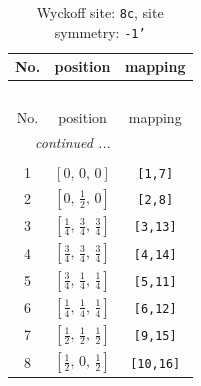 \documentclass[fleqn,8pt]{jsarticle}
\begin{document}
\renewcommand{\arraystretch}{1.2}
\begin{longtable}{ccc}
\caption{Wyckoff site: {\tt 8c}, site symmetry: {\tt -1'}}
 \\
 \hline \hline
No. & position & mapping \\ \hline \endfirsthead

\multicolumn{2}{l}{\tablename\ \thetable{}} \\
 \hline \hline
No. & position & mapping \\ \hline \endhead

 \hline \hline
\multicolumn{2}{r}{\footnotesize\it continued ...} \\ \endfoot

 \hline \hline
\multicolumn{2}{r}{} \\ \endlastfoot

1 & $\left[ 0,\, 0,\, 0 \right]$ & {\tt [1,7]} \\ \hline
2 & $\left[ 0,\, \frac{1}{2},\, 0 \right]$ & {\tt [2,8]} \\ \hline
3 & $\left[ \frac{1}{4},\, \frac{3}{4},\, \frac{3}{4} \right]$ & {\tt [3,13]} \\ \hline
4 & $\left[ \frac{3}{4},\, \frac{3}{4},\, \frac{3}{4} \right]$ & {\tt [4,14]} \\ \hline
5 & $\left[ \frac{3}{4},\, \frac{1}{4},\, \frac{1}{4} \right]$ & {\tt [5,11]} \\ \hline
6 & $\left[ \frac{1}{4},\, \frac{1}{4},\, \frac{1}{4} \right]$ & {\tt [6,12]} \\ \hline
7 & $\left[ \frac{1}{2},\, \frac{1}{2},\, \frac{1}{2} \right]$ & {\tt [9,15]} \\ \hline
8 & $\left[ \frac{1}{2},\, 0,\, \frac{1}{2} \right]$ & {\tt [10,16]} \\
\end{longtable}
\renewcommand{\arraystretch}{1.2}
\end{document}

